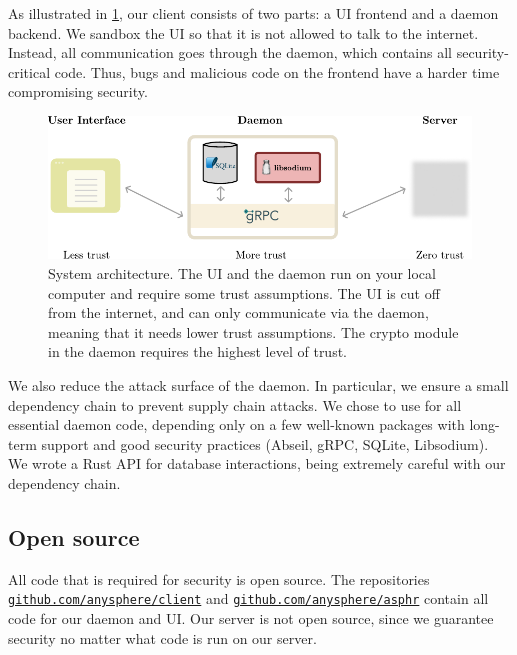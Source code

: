 As illustrated in \cref{fig:systemdiagram}, our client consists of two parts: a UI frontend and a daemon backend. We sandbox the UI so that it is not allowed to talk to the internet. Instead, all communication goes through the daemon, which contains all security-critical code. Thus, bugs and malicious code on the frontend have a harder time compromising security.
\begin{figure}[t!]
    \centering
    \includegraphics[width=\textwidth]{sysdiagramalt.pdf}
\caption{System architecture. The UI and the daemon run on your local computer and require some trust assumptions. The UI is cut off from the internet, and can only communicate via the daemon, meaning that it needs lower trust assumptions. The crypto module in the daemon requires the highest level of trust.}
\label{fig:systemdiagram}
\end{figure}

We also reduce the attack surface of the daemon. In particular, we ensure a small dependency chain to prevent supply chain attacks. We chose to use \Cpp for all essential daemon code, depending only on a few well-known packages with long-term support and good security practices (Abseil, gRPC, SQLite, Libsodium). We wrote a Rust API for database interactions, being extremely careful with our dependency chain. 


\subsection{Open source}

All code that is required for security is open source. The repositories \\ {\tt \href{https://github.com/anysphere/client}{github.com/anysphere/client}} and  {\tt \href{https://github.com/anysphere/asphr}{github.com/anysphere/asphr}} contain all code for our daemon and UI. Our server is not open source, since we guarantee security no matter what code is run on our server. 

